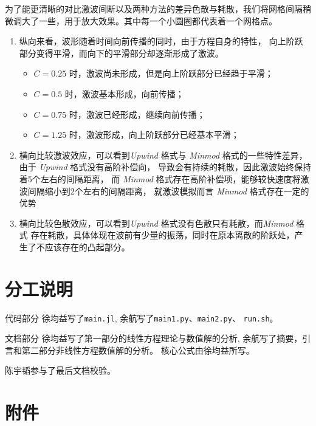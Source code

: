 \documentclass[10.5pt
]{article}
\begin{document}
为了能更清晰的对比激波间断以及两种方法的差异色散与耗散，我们将网格间隔稍微调大了一些，用于放大效果。其中每一个小圆圈都代表着一个网格点。
\begin{enumerate}
\item
    纵向来看，波形随着时间向前传播的同时，由于方程自身的特性，
    向上阶跃部分变得平滑，而向下的平滑部分却逐渐形成了激波。
\begin{itemize}
	\item $C = 0.25$ 时，激波尚未形成，但是向上阶跃部分已经趋于平滑；
	\item $C = 0.5$  时，激波基本形成，向前传播；
	\item $C = 0.75$ 时，激波已经形成，继续向前传播；
	\item $C = 1.25$ 时，激波形成，向上阶跃部分已经基本平滑；
\end{itemize}

\item
    横向比较激波效应，可以看到\textit{Upwind} 格式与 \textit{Minmod} 格式的一些特性差异，由于 \textit{Upwind} 格式没有高阶补偿向，
    导致会有持续的耗散，因此激波始终保持着5个左右的间隔距离，
    而 \textit{Minmod} 格式存在高阶补偿项，能够较快速度将激波间隔缩小到2个左右的间隔距离，
    就激波模拟而言 \textit{Minmod} 格式存在一定的优势
\item
    横向比较色散效应，可以看到\textit{Upwind} 格式没有色散只有耗散，而\textit{Minmod} 格式
    存在耗散，具体体现在波前有少量的振荡，同时在原本离散的阶跃处，产生了不应该存在的凸起部分。
\end{enumerate}

\section{分工说明}

代码部分
徐均益写了\verb|main.jl|, 
余航写了\verb|main1.py|、\verb|main2.py|、 \verb|run.sh|。

文档部分
徐均益写了第一部分的线性方程理论与数值解的分析, 余航写了摘要，引言和第二部分非线性方程数值解的分析。
核心公式由徐均益所写。

陈宇韬参与了最后文档校验。
\section{附件}
\end{document}
